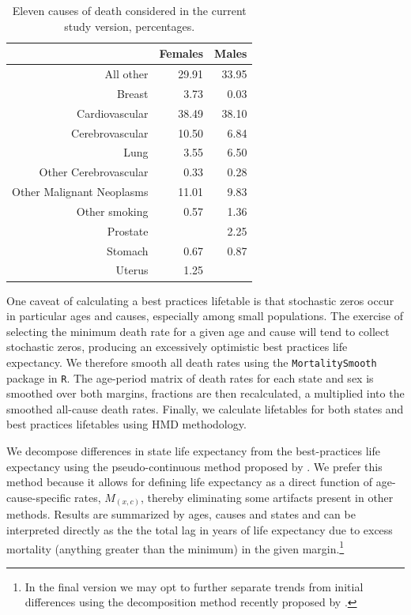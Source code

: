 \documentclass[11pt,oneside,a4paper]{article} %
\begin{document}
\begin{table}[ht]
\centering
\caption{Eleven causes of death considered in the current study version,
percentages.}
\label{tab:desc}
\begin{tabular}{rrr}
 & Females & Males \\ 
  \hline
All other & 29.91 & 33.95 \\ 
  Breast & 3.73 & 0.03 \\ 
  Cardiovascular & 38.49 & 38.10 \\ 
  Cerebrovascular & 10.50 & 6.84 \\ 
  Lung & 3.55 & 6.50 \\ 
  Other Cerebrovascular & 0.33 & 0.28 \\ 
  Other Malignant Neoplasms & 11.01 & 9.83 \\ 
  Other smoking & 0.57 & 1.36 \\ 
  Prostate &  & 2.25 \\ 
  Stomach & 0.67 & 0.87 \\ 
  Uterus & 1.25 &  \\ 
   \hline
\end{tabular}
\end{table}

One caveat of calculating a best practices lifetable is that stochastic zeros
occur in particular ages and causes, especially among small populations. The
exercise of selecting the minimum death rate for a given age and cause will tend
to collect stochastic zeros, producing an excessively optimistic best practices
life expectancy. We therefore smooth all death rates using
the \texttt{MortalitySmooth} package \citep{GC2012} in \texttt{R}. The age-period
matrix of death rates for each state and sex is smoothed over both margins,
fractions are then recalculated, a multiplied into the smoothed all-cause death
rates. Finally, we calculate lifetables for both states and best practices
lifetables using HMD methodology.

We decompose differences in state life expectancy from the best-practices life
expectancy using the pseudo-continuous method proposed by
\citet{horiuchi2008decomposition}. We prefer this method because it allows for
defining life expectancy as a direct function of age-cause-specific rates,
$M_{(x,c)}$, thereby eliminating some artifacts present in other methods.
Results are summarized by ages, causes and states and can be interpreted
directly as the the total lag in years of life expectancy due to excess
mortality (anything greater than the minimum) in the given margin.\footnote{In
the final version we may opt to further separate trends from initial
differences using the decomposition method recently proposed by
\citet{DimaDecomp2014}.}
\end{document}
